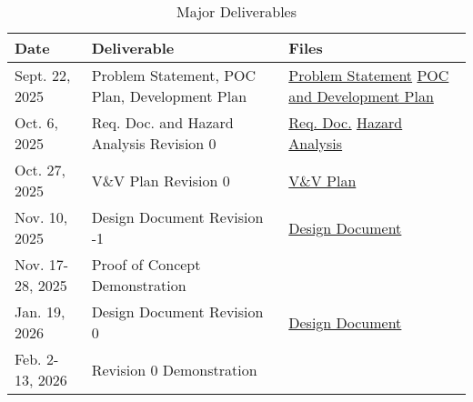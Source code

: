 \documentclass{article}
\begin{document}
\FloatBarrier
\begin{table}[h]
  \caption{Major Deliverables} \label{TblMajorDeliverables}
  \begin{tabularx}{\textwidth}{llX}
    \toprule
    \textbf{Date}    & \textbf{Deliverable}                          & \textbf{Files}                                                                                                                                   \\
    \midrule
    Sept. 22, 2025   & Problem Statement, POC Plan, Development Plan & \href{https://github.com/ZifanSi/vision-guided-tracker/blob/main/docs/ProblemStatementAndGoals/ProblemStatement.pdf}{Problem Statement} \newline
    \href{https://github.com/ZifanSi/vision-guided-tracker/blob/main/docs/DevelopmentPlan/DevelopmentPlan.pdf}{POC and Development Plan}                                                                                \\
    Oct. 6, 2025     & Req. Doc. and Hazard Analysis Revision 0      & \href{https://github.com/ZifanSi/vision-guided-tracker/blob/main/docs/SRS/SRS.pdf}{Req. Doc.}    \newline
    \href{https://github.com/ZifanSi/vision-guided-tracker/blob/main/docs/HazardAnalysis/HazardAnalysis.pdf}{Hazard Analysis}                                                                                           \\
    Oct. 27, 2025    & V\&V Plan Revision 0                          & \href{https://github.com/ZifanSi/vision-guided-tracker/blob/main/docs/VnVPlan/VnVPlan.pdf}{V\&V Plan}                                            \\
    Nov. 10, 2025    & Design Document Revision -1                   & \href{https://github.com/ZifanSi/vision-guided-tracker/blob/main/docs/Design/README.md}{Design Document}                                         \\
    Nov. 17-28, 2025 & Proof of Concept Demonstration                &                                                                                                                                                  \\
    Jan. 19, 2026    & Design Document Revision 0                    & \href{https://github.com/ZifanSi/vision-guided-tracker/blob/main/docs/Design/README.md}{Design Document}                                         \\
    Feb. 2-13, 2026  & Revision 0 Demonstration                      &                                                                                                                                                  \\

\end{tabularx}
\end{table}
\end{document}
